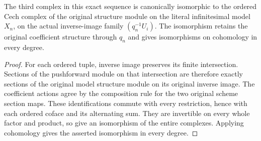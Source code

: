 \begin{lemma}
\label{lem:fibre-infinitesimal-original-model-complex}
\leanok
The third complex in this exact sequence is canonically isomorphic to
the ordered Cech complex of the original structure module on the literal
infinitesimal model $X_n$, on the actual inverse-image family
$(q_n^{-1}U_i)$. The isomorphism retains the original coefficient
structure through $q_n$ and gives isomorphisms on cohomology in every
degree.
\end{lemma}
\begin{proof}
For each ordered tuple, inverse image preserves its finite intersection.
Sections of the pushforward module on that intersection are therefore
exactly sections of the original model structure module on its original
inverse image. The coefficient actions agree by the composition rule
for the two original scheme section maps. These identifications commute
with every restriction, hence with each ordered coface and its
alternating sum. They are invertible on every whole factor and product,
so give an isomorphism of the entire complexes. Applying cohomology
gives the asserted isomorphism in every degree.
\end{proof}
